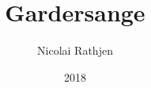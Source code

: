 \documentclass[a4paper]{article}
\title{Gardersange}
\date{2018}
\author{Nicolai Rathjen}
\begin{document}
\begin{titlepage}
  \centering
  \maketitle
\end{titlepage}


\end{document}
